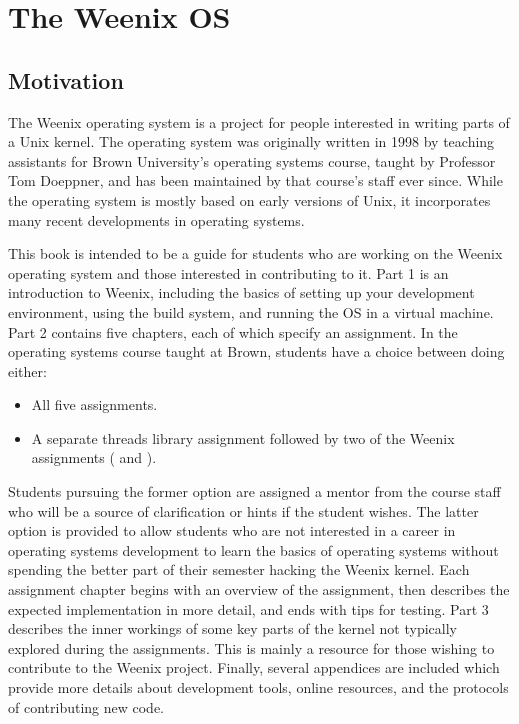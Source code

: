\chapter{The Weenix OS}
\label{the-weenix-os}

\section{Motivation}


The Weenix operating system is a project for people interested in writing parts of a Unix kernel. The operating system was originally written in 1998 by teaching assistants for Brown University's operating systems course, taught by Professor Tom Doeppner, and has been maintained by that course's staff ever since. While the operating system is mostly based on early versions of Unix, it incorporates many recent developments in operating systems.
    
This book is intended to be a guide for students who are working on the Weenix operating system and those interested in contributing to it.
Part 1 is an introduction to Weenix, including the basics of setting up your development environment, using the build system, and running the OS in a virtual machine.
Part 2 contains five chapters, each of which specify an assignment. In the operating systems course taught at Brown, students have a choice between doing either:

\begin{itemize}
    \item All five assignments.
    \item A separate threads library assignment followed by two of the Weenix assignments ( and ).
\end{itemize}

Students pursuing the former option are assigned a mentor from the course staff who will be a source of clarification or hints if the student wishes. The latter option is provided to allow students who are not interested in a career in operating systems development to learn the basics of operating systems without spending the better part of their semester hacking the Weenix kernel. Each assignment chapter begins with an overview of the assignment, then describes the expected implementation in more detail, and ends with tips for testing.
Part 3 describes the inner workings of some key parts of the kernel not typically explored during the assignments. This is mainly a resource for those wishing to contribute to the Weenix project.
Finally, several appendices are included which provide more details about development tools, online resources, and the protocols of contributing new code.

